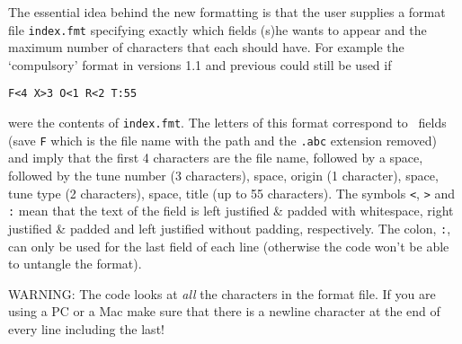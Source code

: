 The essential idea behind the new formatting is that the user supplies a format
file {\tt index.fmt} specifying exactly which fields (s)he wants to appear and
the maximum number of characters that each should have. For example
the `compulsory' format in versions 1.1 and previous could still be used if
\begin{verbatim}
F<4 X>3 O<1 R<2 T:55
\end{verbatim}
were the contents of {\tt index.fmt}. The letters of this format correspond
to \abc\ fields (save {\tt F} which is the file name with the path
and the {\tt .abc} extension removed) and imply that the first
4 characters are the file name, followed by a space, followed by the tune
number (3 characters), space, origin (1 character), space, tune type (2
characters), space, title (up to 55 characters). The symbols {\tt <}, {\tt >}
and {\tt :} mean that the text of the field is left justified \& padded with
whitespace, right justified \& padded and left justified without padding,
respectively. The colon, {\tt :}, can only
be used for the last field of each line (otherwise the code won't be able to
untangle the format).

WARNING: The code looks at {\em all} the characters in the format file. If you
are using a PC or a Mac make sure that there is
a newline character at the end of every line including the last!

